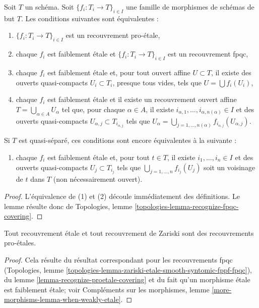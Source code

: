 \begin{lemma}
\label{lemma-recognize-proetale-covering}
Soit $T$ un schéma. Soit $\{f_i : T_i \to T\}_{i \in I}$ une famille de
morphismes de schémas de but $T$. Les conditions suivantes sont équivalentes :
\begin{enumerate}
\item $\{f_i : T_i \to T\}_{i \in I}$ est un recouvrement pro-\'etale,
\item chaque $f_i$ est faiblement \'etale et $\{f_i : T_i \to T\}_{i \in I}$
est un recouvrement fpqc,
\item chaque $f_i$ est faiblement \'etale et, pour tout ouvert affine $U \subset T$,
il existe des ouverts quasi-compacts $U_i \subset T_i$, presque tous vides,
tels que $U = \bigcup f_i(U_i)$,
\item chaque $f_i$ est faiblement \'etale et il existe un recouvrement ouvert affine
$T = \bigcup_{\alpha \in A} U_\alpha$ tel que, pour chaque $\alpha \in A$,
il existe $i_{\alpha, 1}, \ldots, i_{\alpha, n(\alpha)} \in I$
et des ouverts quasi-compacts $U_{\alpha, j} \subset T_{i_{\alpha, j}}$ tels que
$U_\alpha =
\bigcup_{j = 1, \ldots, n(\alpha)} f_{i_{\alpha, j}}(U_{\alpha, j})$.
\end{enumerate}
Si $T$ est quasi-séparé, ces conditions sont encore équivalentes à la suivante :
\begin{enumerate}
\item[(5)] chaque $f_i$ est faiblement \'etale et, pour tout $t \in T$, il existe
$i_1, \ldots, i_n \in I$ et des ouverts quasi-compacts $U_j \subset T_{i_j}$
tels que $\bigcup_{j = 1, \ldots, n} f_{i_j}(U_j)$ soit un
voisinage de $t$ dans $T$ (non nécessairement ouvert).
\end{enumerate}
\end{lemma}

\begin{proof}
L'équivalence de (1) et (2) découle immédiatement des définitions.
Le lemme résulte donc de
Topologies, lemme \ref{topologies-lemma-recognize-fpqc-covering}.
\end{proof}

\begin{lemma}
\label{lemma-etale-proetale}
Tout recouvrement \'etale et tout recouvrement de Zariski sont des recouvrements pro-\'etales.
\end{lemma}

\begin{proof}
Cela résulte du résultat correspondant pour les recouvrements fpqc
(Topologies, lemme
\ref{topologies-lemma-zariski-etale-smooth-syntomic-fppf-fpqc}),
du lemme \ref{lemma-recognize-proetale-covering} et
du fait qu'un morphisme \'etale est faiblement \'etale; voir
Compléments sur les morphismes, lemme \ref{more-morphisms-lemma-when-weakly-etale}.
\end{proof}

